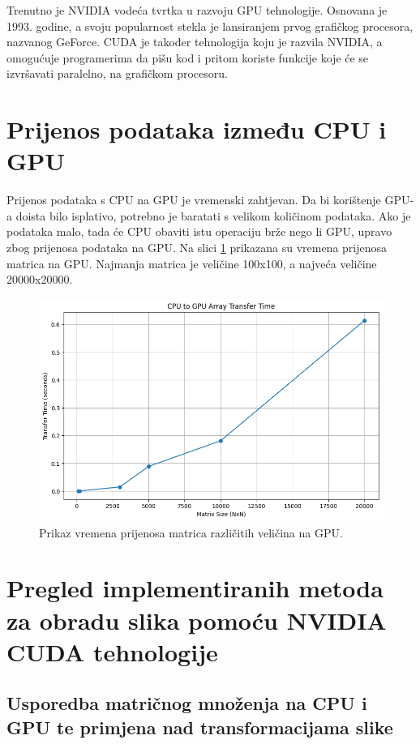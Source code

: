 \documentclass[a4paper,twocolumn]{article}
\begin{document}
        Trenutno je NVIDIA vodeća tvrtka u razvoju GPU tehnologije. Osnovana je 1993. godine, a svoju popularnost stekla je lansiranjem prvog grafičkog procesora, nazvanog GeForce. CUDA je također tehnologija koju je razvila NVIDIA, a omogućuje programerima da pišu kod i pritom koriste funkcije koje će se izvršavati paralelno, na grafičkom procesoru.
        
        \section{Prijenos podataka između CPU i GPU}
        
        Prijenos podataka s CPU na GPU je vremenski zahtjevan. Da bi korištenje GPU-a doista bilo isplativo, potrebno je baratati s velikom količinom podataka. Ako je podataka malo, tada će CPU obaviti istu operaciju brže nego li GPU, upravo zbog prijenosa podataka na GPU. Na slici \ref{fig:data_to_gpu} prikazana su vremena prijenosa matrica na GPU. Najmanja matrica je veličine 100x100, a najveća veličine 20000x20000. 
        
        \begin{figure}[H]
        	\centering
        	\includegraphics[width=0.9\linewidth]{slike/data_to_gpu.png}
        	\caption{Prikaz vremena prijenosa matrica različitih veličina na GPU.}
        	\label{fig:data_to_gpu}
        \end{figure}
        
	\section{Pregled implementiranih metoda za obradu slika pomoću NVIDIA CUDA tehnologije}
	
	\subsection{Usporedba matričnog množenja na CPU i GPU te primjena nad transformacijama slike}
	
\end{document}
